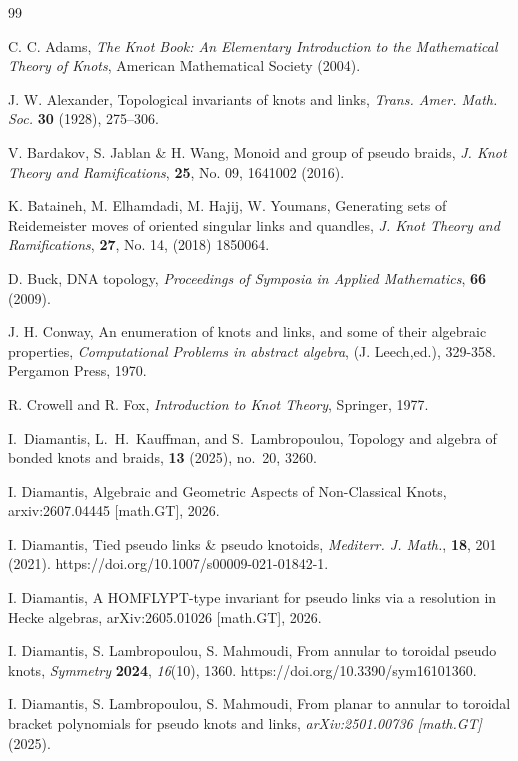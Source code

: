 \documentclass[a4paper, reqno, 12pt]{amsart}
\theoremstyle{plain}
\theoremstyle{definition}
\begin{document}
\begin{thebibliography}{99}

 {\sc C. C. Adams}, {\em The Knot Book: An Elementary Introduction to the Mathematical Theory of Knots}, 
American Mathematical Society (2004).

{\sc J. W. Alexander},
Topological invariants of knots and links,
{\it Trans. Amer. Math. Soc.} {\bf 30} (1928), 275--306.

 {\sc V. Bardakov, S. Jablan \& H. Wang}, Monoid and group of pseudo braids,  {\em J. Knot Theory and Ramifications}, {\bf 25}, No. 09, 1641002 (2016).

 {\sc K. Bataineh, M. Elhamdadi, M. Hajij, W. Youmans}, Generating sets of Reidemeister moves of oriented singular links and quandles, {\it J. Knot Theory and Ramifications}, {\bf 27}, No. 14, (2018) 1850064.

 {\sc D. Buck}, DNA topology, {\em Proceedings of Symposia in Applied Mathematics}, {\bf 66} (2009).

 {\sc J. H. Conway}, An enumeration of knots and links, and some of their algebraic properties, {\it Computational Problems in abstract algebra},  (J. Leech,ed.), 329-358. Pergamon Press, 1970.

{\sc R. Crowell and R. Fox},
{\em Introduction to Knot Theory},
Springer, 1977.

I.~Diamantis, L.~H.~Kauffman, and S.~Lambropoulou,
\newblock Topology and algebra of bonded knots and braids,
 \textbf{13} (2025), no.~20, 3260.


 {\sc I. Diamantis}, Algebraic and Geometric Aspects of Non-Classical Knots, arxiv:2607.04445 [math.GT], 2026.

 {\sc I. Diamantis}, Tied pseudo links \& pseudo knotoids, {\it Mediterr. J. Math.}, {\bf 18}, 201 (2021). https://doi.org/10.1007/s00009-021-01842-1.

 {\sc I. Diamantis}, A HOMFLYPT-type invariant for pseudo links via a resolution in Hecke algebras, arXiv:2605.01026 [math.GT], 2026.

 {\sc I. Diamantis, S. Lambropoulou, S. Mahmoudi}, From annular to toroidal pseudo knots, {\em Symmetry} {\bf 2024}, {\it 16}(10), 1360. https://doi.org/10.3390/sym16101360.

 {\sc I. Diamantis, S. Lambropoulou, S. Mahmoudi}, From planar to annular to toroidal bracket polynomials for pseudo knots and links, \textit{arXiv:2501.00736 [math.GT]} (2025).


\end{thebibliography}
\end{document}
